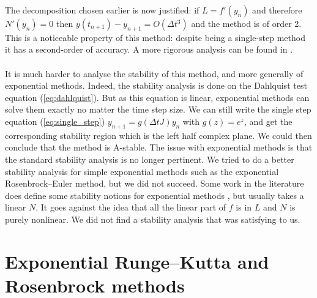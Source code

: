       The decomposition chosen earlier is now justified: if $L = f'\left(y_n\right)$ and therefore $N'\left(y_n\right) = 0$ then $y\left(t_{n+1}\right) - y_{n+1} = O\left(\Delta t^3\right)$ and the method is of order 2.
      This is a noticeable property of this method: despite being a single-step method it has a second-order of accuracy.
      A more rigorous analysis can be found in \cite{HochbruckOstermannSchweitzer2009}.

      \paragraph{}
      It is much harder to analyse the stability of this method, and more generally of exponential methods.
      Indeed, the stability analysis is done on the Dahlquist test equation (\ref{eq:dahlquist}).
      But as this equation is linear, exponential methods can solve them exactly no matter the time step size.
      We can still write the single step equation (\ref{eq:single_step}) $y_{n+1} = g\left(\Delta tJ\right)y_n$ with $g\left(z\right) = e^z$, and get the corresponding stability region which is the left half complex plane.
      We could then conclude that the method is A-stable.
      The issue with exponential methods is that the standard stability analysis is no longer pertinent.
      We tried to do a better stability analysis for simple exponential methods such as the exponential Rosenbrock--Euler method, but we did not succeed.
      Some work in the literature does define some stability notions for exponential methods \cite{DuZhu2004}, but usually takes a linear $N$.
      It goes against the idea that all the linear part of $f$ is in $L$ and $N$ is purely nonlinear.
      We did not find a stability analysis that was satisfying to us.


  \section{Exponential Runge--Kutta and Rosenbrock methods}

